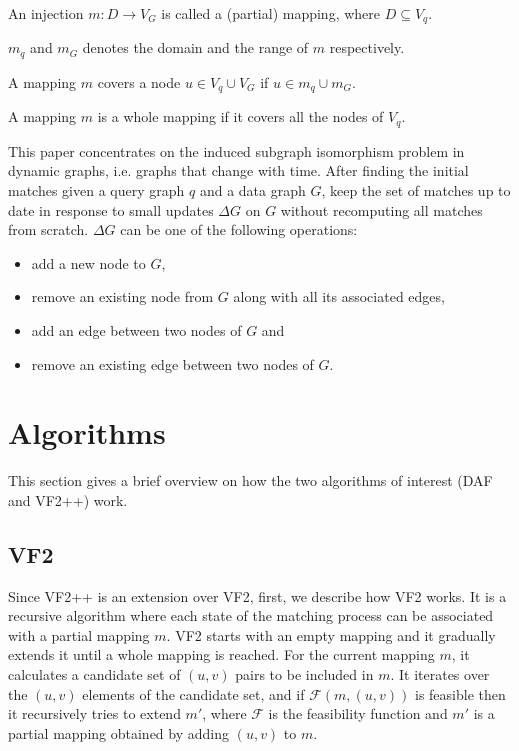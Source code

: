 \begin{definition}[Mapping]
    An injection $m : D \rightarrow V_G$ is called a (partial) mapping, where $D \subseteq V_q$.
\end{definition}

\begin{notation}
    $m_q$ and $m_G$ denotes the domain and the range of $m$ respectively.
\end{notation}

\begin{definition}[Coverage]
    A mapping $m$ covers a node $u \in V_q \cup V_G$ if $u \in m_q \cup m_G$.
\end{definition}

\begin{definition}
    A mapping $m$ is a whole mapping if it covers all the nodes of $V_q$.
\end{definition}


This paper concentrates on the induced subgraph isomorphism problem in dynamic graphs, 
i.e. graphs that change with time. After finding the initial matches given a query graph
\(q\) and a data graph \(G\), keep the set of matches up to date in response to small 
updates \(\Delta G \) on \(G\) without recomputing all matches from scratch. \(\Delta G\) 
can be one of the following operations:
\begin{itemize}
    \item add a new node to \(G\),
    \item remove an existing node from \(G\) along with all its associated edges,
    \item add an edge between two nodes of \(G\) and
    \item remove an existing edge between two nodes of \(G\).
\end{itemize}

\section{Algorithms}

This section gives a brief overview on how the two algorithms of interest (DAF and VF2++)
work.

\subsection{VF2}

Since VF2++ is an extension over VF2, first, we describe how VF2 works. It is a recursive 
algorithm where each state of the matching process can be associated with a partial mapping
$m$. VF2 starts with an empty mapping and it 
gradually extends it until a whole mapping is reached. For the current mapping $m$, it calculates a 
candidate set of $(u, v)$ pairs to be included in $m$. It iterates over the
$(u, v)$ elements of the candidate set, and if $\mathcal{F}(m, (u, v))$ is feasible then it recursively 
tries to extend $m'$, where $\mathcal{F}$ is the feasibility function and $m'$ is a partial mapping
obtained by adding $(u, v)$ to $m$.

